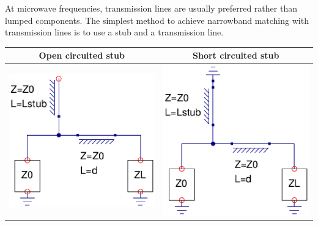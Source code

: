 At microwave frequencies, transmission lines are usually preferred rather than lumped components. The simplest method to achieve narrowband matching with transmission lines is to use a stub and a transmission line.

\begin{table}[H]
  \centering
  \begin{tabular}{ | c | c | }
    \hline
    Open circuited stub & Short circuited stub\\ \hline
    \begin{minipage}{.4\textwidth}
      \includegraphics[width=\linewidth]{./images/Synthesis/Impedance_Matching/SingleStubOpen}
    \end{minipage}
    &
    \begin{minipage}{.4\textwidth}
      \includegraphics[width=\linewidth]{./images/Synthesis/Impedance_Matching/SingleStubShort}

\end{minipage}
\end{tabular}
\end{table}
